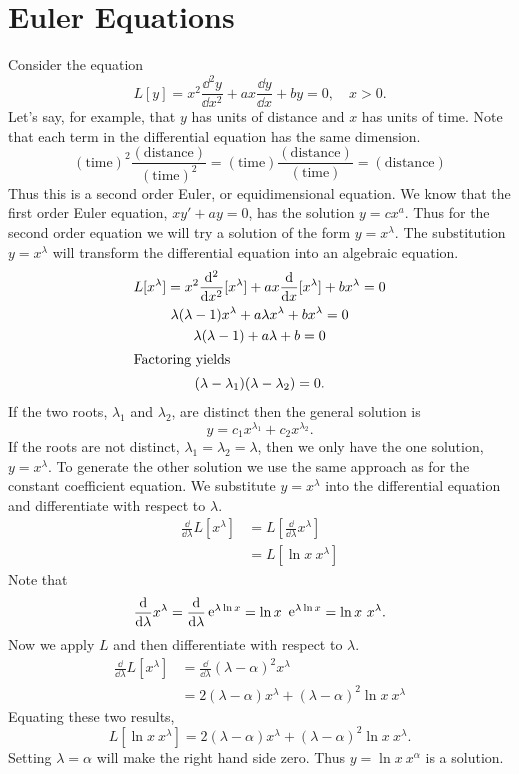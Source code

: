 \section{Euler Equations}




Consider the equation
\[
L[y] = x^2 \frac{\dd^2 y}{\dd x^2} + a x \frac{\dd y}{\dd x} + b y = 0, 
\quad x > 0.
\]
Let's say, for example, that $y$ has units of distance and $x$ has 
units of time.  Note that each term in the differential equation has the same 
dimension.
\[
(\mathrm{time})^2 \frac{(\mathrm{distance})}{(\mathrm{time})^2} 
= (\mathrm{time}) \frac{(\mathrm{distance})}{(\mathrm{time})}
= (\mathrm{distance}) 
\]
Thus this is a second order Euler, or equidimensional equation.
We know that the first order Euler equation, $x y' + a y = 0$, has 
the solution $y = c x^a$.  Thus for the second order equation we will
try a solution of the form $y = x^\lambda$.
The substitution $y = x^\lambda$ will transform the differential equation
into an algebraic equation.
\begin{gather*}
  L[x^\lambda] = x^2 \frac{\mathrm{d}^2}{\mathrm{d} x^2}[x^\lambda] + a x \frac{\mathrm{d}}{\mathrm{d} x} [x^\lambda] + b x^\lambda = 0\\
  \lambda(\lambda-1)x^\lambda + a \lambda x^\lambda + b x^\lambda = 0 \\
  \lambda(\lambda-1) + a \lambda + b = 0 \\
  \intertext{Factoring yields}
  (\lambda-\lambda_1)(\lambda-\lambda_2) = 0.
\end{gather*}
If the two roots, $\lambda_1$ and $\lambda_2$, are distinct then
the general solution is
\[ 
y = c_1 x^{\lambda_1} + c_2 x^{\lambda_2}. 
\]
If the roots are not distinct, $\lambda_1 = \lambda_2 = \lambda$, then we only
have the one solution, $y = x^\lambda$.  To generate the other solution we 
use the same approach as for the constant coefficient equation.  We substitute
$y = x^\lambda$ into the differential equation and differentiate with
respect to $\lambda$.
\begin{align*}
  \frac{\dd}{\dd \lambda}L[x^\lambda] 
  &= L[\frac{\dd}{\dd \lambda} x^\lambda] \\
  &= L[\ln x \ x^\lambda]
\end{align*}
Note that
\[ 
\frac{\mathrm{d}}{\mathrm{d} \lambda}x^\lambda = \frac{\mathrm{d}}{\mathrm{d} \lambda} \mathop{\mathrm{e}}\nolimits^{\lambda \ln x}
= \ln x \ \mathop{\mathrm{e}}\nolimits^{\lambda \ln x} = \ln x \ x^\lambda.
\]
Now we apply $L$ and then differentiate with respect to $\lambda$.
\begin{align*}
  \frac{\dd}{\dd \lambda} L[x^\lambda] 
  &= \frac{\dd}{\dd \lambda} (\lambda-\alpha)^2 x^\lambda \\
  &= 2 (\lambda-\alpha) x^\lambda + (\lambda-\alpha)^2 \ln x\ x^\lambda
\end{align*}
Equating these two results,
\[ 
L[\ln x\ x^\lambda] = 2 (\lambda-\alpha) x^\lambda + (\lambda-\alpha)^2 \ln x\ x^\lambda.
\]
Setting $\lambda = \alpha$ will make the right hand side zero.  Thus 
$y= \ln x\ x^\alpha$ is a solution.  

